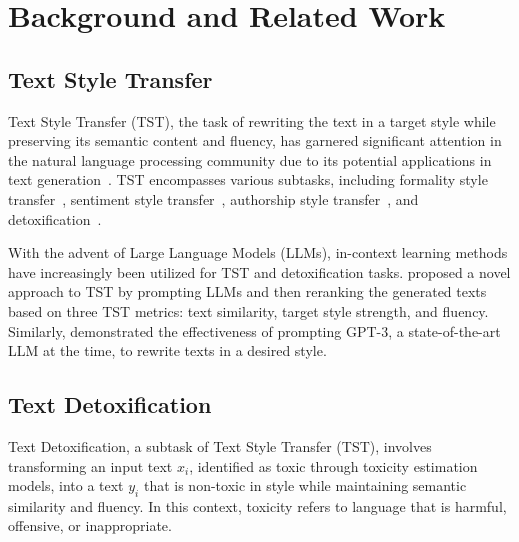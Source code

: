 \section{Background and Related Work}
\subsection{Text Style Transfer}

Text Style Transfer (TST), the task of rewriting the text in a target style while preserving its semantic content and fluency, has garnered significant attention in the natural language processing community due to its potential applications in text generation~\cite{DBLP:conf/aaai/FuTPZY18}. TST encompasses various subtasks, including formality style transfer~\cite{DBLP:conf/coling/WangWMLC20, DBLP:conf/acl/LaiTN20}, sentiment style transfer~\cite{DBLP:conf/emnlp/YuZLC21}, authorship style transfer~\cite{DBLP:journals/corr/abs-2406-15586, DBLP:journals/corr/abs-2403-08043}, and detoxification~\cite{DBLP:conf/emnlp/DaleVDLKSP21,DBLP:conf/coling/AtwellHA22, DBLP:journals/corr/abs-2206-02252, DBLP:conf/emnlp/MoskovskiyPP24}. 

With the advent of Large Language Models (LLMs), in-context learning methods have increasingly been utilized for TST and detoxification tasks. \citet{DBLP:conf/emnlp/SuzgunMJ22} proposed a novel approach to TST by prompting LLMs and then reranking the generated texts based on three TST metrics: text similarity, target style strength, and fluency. Similarly, \citet{DBLP:conf/acl/ReifIYCCW22} demonstrated the effectiveness of prompting GPT-3, a state-of-the-art LLM at the time, to rewrite texts in a desired style.

\subsection{Text Detoxification}

Text Detoxification, a subtask of Text Style Transfer (TST), involves transforming an input text $x_i$, identified as toxic through toxicity estimation models, into a text $y_i$ that is non-toxic in style while maintaining semantic similarity and fluency. In this context, toxicity refers to language that is harmful, offensive, or inappropriate.

